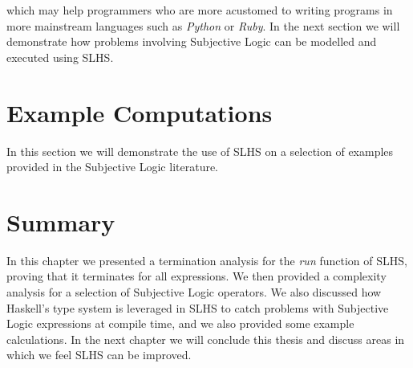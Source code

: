 \documentclass[thesis.tex]{subfiles}
\begin{document}
which may help programmers who are more acustomed to writing programs in more mainstream
languages such as \emph{Python} or \emph{Ruby}. In the next section we will demonstrate how
problems involving Subjective Logic can be modelled and executed using SLHS.



\section{Example Computations}

In this section we will demonstrate the use of SLHS on a selection of examples provided in the
Subjective Logic literature.








\section{Summary}

In this chapter we presented a termination analysis for the \emph{run} function of SLHS, proving
that it terminates for all expressions. We then provided a complexity analysis for a selection
of Subjective Logic operators. We also discussed how Haskell's type system is leveraged in SLHS
to catch problems with Subjective Logic expressions at compile time, and we also provided some
example calculations. In the next chapter we will conclude this thesis and discuss areas in which
we feel SLHS can be improved.
\end{document}
